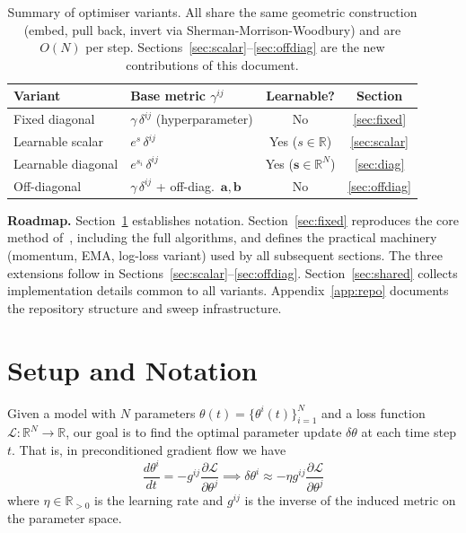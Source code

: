 \documentclass{article}
\newcommand{\loss}{\mathcal{L}}
\newcommand{\vecb}[1]{\boldsymbol{#1}}
\begin{document}
\begin{table}[ht]
\centering
\caption{Summary of optimiser variants.
All share the same geometric construction (embed, pull back, invert via Sherman-Morrison-Woodbury)
and are $O(N)$ per step.
Sections~\ref{sec:scalar}--\ref{sec:offdiag} are the new contributions of this document.}
\label{tab:variants}
\small
\begin{tabular}{@{}llcc@{}}
    \toprule
    \textbf{Variant} & \textbf{Base metric $\gamma^{ij}$} & \textbf{Learnable?} & \textbf{Section} \\
    \midrule
    Fixed diagonal     & $\gamma\,\delta^{ij}$ (hyperparameter)     & No  & \ref{sec:fixed} \\
    Learnable scalar   & $e^s\,\delta^{ij}$                         & Yes ($s\in\mathbb{R}$) & \ref{sec:scalar} \\
    Learnable diagonal & $e^{s_i}\,\delta^{ij}$                     & Yes ($\vecb{s}\in\mathbb{R}^N$) & \ref{sec:diag} \\
    Off-diagonal       & $\gamma\,\delta^{ij}$ + off-diag.\ $\vecb{a},\vecb{b}$ & No & \ref{sec:offdiag} \\
    \bottomrule
\end{tabular}
\end{table}

\noindent
\textbf{Roadmap.}\quad
Section~\ref{sec:setup} establishes notation.
Section~\ref{sec:fixed} reproduces the core method of~\cite{harvey2025},
including the full algorithms, and defines the practical machinery
(momentum, EMA, log-loss variant) used by all subsequent sections.
The three extensions follow in Sections~\ref{sec:scalar}--\ref{sec:offdiag}.
Section~\ref{sec:shared} collects implementation details common to all variants.
Appendix~\ref{app:repo} documents the repository structure and sweep infrastructure.


\section{Setup and Notation}\label{sec:setup}
Given a model with $N$ parameters $\theta(t)=\{\theta^i(t)\}_{i=1}^N$ and a loss function
$\loss:\mathbb{R}^N\to\mathbb{R}$,
our goal is to find the optimal parameter update $\delta \theta$ at each time step $t$.
That is, in preconditioned gradient flow we have
\begin{equation}\label{eq:grad-flow}
    \frac{d \theta^i}{dt} = - g^{ij} \frac{\partial \loss}{\partial \theta^j}
    \implies
    \delta \theta^i \approx - \eta g^{ij} \frac{\partial \loss}{\partial \theta^j}
\end{equation}
where $\eta\in\mathbb{R}_{>0}$ is the learning rate and $g^{ij}$ is the inverse of the induced metric on the parameter space.
\end{document}
